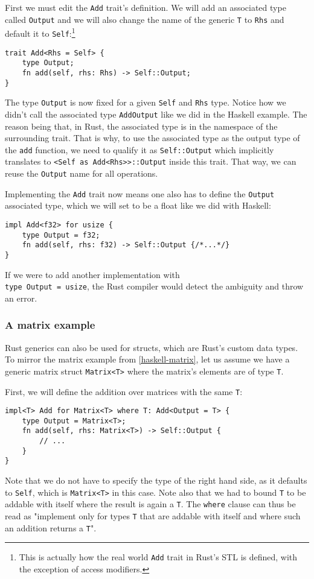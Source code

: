 First we must edit the \verb|Add| trait's definition. We will add an associated type called \verb|Output| and we will also change the name of the generic \verb|T| to \verb|Rhs| and default it to \verb|Self|:\footnote{This is actually how the real world \verb|Add| trait in Rust's STL is defined, with the exception of access modifiers.}
\begin{verbatim}
trait Add<Rhs = Self> {
    type Output;
    fn add(self, rhs: Rhs) -> Self::Output;
}
\end{verbatim}
The type \verb|Output| is now fixed for a given \verb|Self| and \verb|Rhs| type. Notice how we didn't call the associated type \verb|AddOutput| like we did in the Haskell example. The reason being that, in Rust, the associated type is in the namespace of the surrounding trait. That is why, to use the associated type as the output type of the \verb|add| function, we need to qualify it as \verb|Self::Output| which implicitly translates to \verb|<Self as Add<Rhs>>::Output| inside this trait. That way, we can reuse the \verb|Output| name for all operations.

Implementing the \verb|Add| trait now means one also has to define the \verb|Output| associated type, which we will set to be a float like we did with Haskell:
\begin{verbatim}
impl Add<f32> for usize {
    type Output = f32;
    fn add(self, rhs: f32) -> Self::Output {/*...*/}
}
\end{verbatim}
If we were to add another implementation with \\ \verb|type Output = usize|, the Rust compiler would detect the ambiguity and throw an error.

\subsubsection{A matrix example}

Rust generics can also be used for structs, which are Rust's custom data types. To mirror the matrix example from \autoref{haskell-matrix}, let us assume we have a generic matrix struct \verb|Matrix<T>| where the matrix's elements are of type \verb|T|.

First, we will define the addition over matrices with the same \verb|T|:
\begin{verbatim}
impl<T> Add for Matrix<T> where T: Add<Output = T> {
    type Output = Matrix<T>;
    fn add(self, rhs: Matrix<T>) -> Self::Output {
        // ...
    }
}
\end{verbatim}
Note that we do not have to specify the type of the right hand side, as it defaults to \verb|Self|, which is \verb|Matrix<T>| in this case. Note also that we had to bound \verb|T| to be addable with itself where the result is again a \verb|T|. The \verb|where| clause can thus be read as "implement only for types \verb|T| that are addable with itself and where such an addition returns a \verb|T|".


